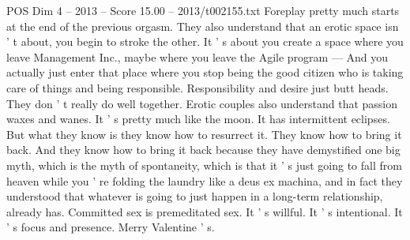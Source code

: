 \begin{textsample}{POS Dim 4 – 2013 – Score 15.00 – 2013/t002155.txt}
Foreplay pretty much starts at the end of the previous orgasm.
They also understand that an erotic space isn ' t about, you begin to stroke the other.
It ' s about you create a space where you leave Management Inc., maybe where you leave the Agile program — And you actually just enter that place where you stop being the good citizen who is taking care of things and being responsible.
Responsibility and desire just butt heads.
They don ' t really do well together.
Erotic couples also understand that passion waxes and wanes.
It ' s pretty much like the moon.
It has intermittent eclipses.
But what they know is they know how to resurrect it.
They know how to bring it back.
And they know how to bring it back because they have demystified one big myth, which is the myth of spontaneity, which is that it ' s just going to fall from heaven while you ' re folding the laundry like a deus ex machina, and in fact they understood that whatever is going to just happen in a long-term relationship, already has.
Committed sex is premeditated sex.
It ' s willful.
It ' s intentional.
It ' s focus and presence.
Merry Valentine ' s.

\end{textsample}
